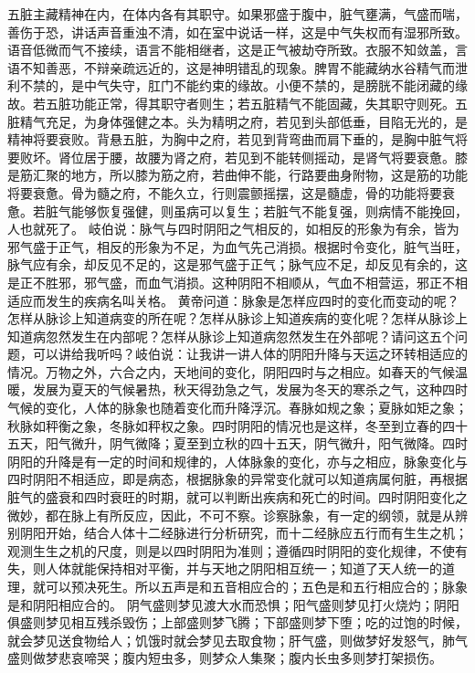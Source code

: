\documentclass[a4paper,12pt,UTF8,twoside]{ctexbook}
\begin{document}
五脏主藏精神在内，在体内各有其职守。如果邪盛于腹中，脏气壅满，气盛而喘，善伤于恐，讲话声音重浊不清，如在室中说话一样，这是中气失权而有湿邪所致。语音低微而气不接续，语言不能相继者，这是正气被劫夺所致。衣服不知敛盖，言语不知善恶，不辩亲疏远近的，这是神明错乱的现象。脾胃不能藏纳水谷精气而泄利不禁的，是中气失守，肛门不能约束的缘故。小便不禁的，是膀胱不能闭藏的缘故。若五脏功能正常，得其职守者则生；若五脏精气不能固藏，失其职守则死。五脏精气充足，为身体强健之本。头为精明之府，若见到头部低垂，目陷无光的，是精神将要衰败。背悬五脏，为胸中之府，若见到背弯曲而肩下垂的，是胸中脏气将要败坏。肾位居于腰，故腰为肾之府，若见到不能转侧摇动，是肾气将要衰惫。膝是筋汇聚的地方，所以膝为筋之府，若曲伸不能，行路要曲身附物，这是筋的功能将要衰惫。骨为髓之府，不能久立，行则震颤摇摆，这是髓虚，骨的功能将要衰惫。若脏气能够恢复强健，则虽病可以复生；若脏气不能复强，则病情不能挽回，人也就死了。
岐伯说：脉气与四时阴阳之气相反的，如相反的形象为有余，皆为邪气盛于正气，相反的形象为不足，为血气先己消损。根据时令变化，脏气当旺，脉气应有余，却反见不足的，这是邪气盛于正气；脉气应不足，却反见有余的，这是正不胜邪，邪气盛，而血气消损。这种阴阳不相顺从，气血不相营运，邪正不相适应而发生的疾病名叫关格。
黄帝问道：脉象是怎样应四时的变化而变动的呢？怎样从脉诊上知道病变的所在呢？怎样从脉诊上知道疾病的变化呢？怎样从脉诊上知道病忽然发生在内部呢？怎样从脉诊上知道病忽然发生在外部呢？请问这五个问题，可以讲给我听吗？岐伯说：让我讲一讲人体的阴阳升降与天运之环转相适应的情况。万物之外，六合之内，天地间的变化，阴阳四时与之相应。如春天的气候温暖，发展为夏天的气候暑热，秋天得劲急之气，发展为冬天的寒杀之气，这种四时气候的变化，人体的脉象也随着变化而升降浮沉。春脉如规之象；夏脉如矩之象；秋脉如秤衡之象，冬脉如秤权之象。四时阴阳的情况也是这样，冬至到立春的四十五天，阳气微升，阴气微降；夏至到立秋的四十五天，阴气微升，阳气微降。四时阴阳的升降是有一定的时间和规律的，人体脉象的变化，亦与之相应，脉象变化与四时阴阳不相适应，即是病态，根据脉象的异常变化就可以知道病属何脏，再根据脏气的盛衰和四时衰旺的时期，就可以判断出疾病和死亡的时间。四时阴阳变化之微妙，都在脉上有所反应，因此，不可不察。诊察脉象，有一定的纲领，就是从辨别阴阳开始，结合人体十二经脉进行分析研究，而十二经脉应五行而有生生之机；观测生生之机的尺度，则是以四时阴阳为准则；遵循四时阴阳的变化规律，不使有失，则人体就能保持相对平衡，并与天地之阴阳相互统一；知道了天人统一的道理，就可以预决死生。所以五声是和五音相应合的；五色是和五行相应合的；脉象是和阴阳相应合的。
阴气盛则梦见渡大水而恐惧；阳气盛则梦见打火烧灼；阴阳俱盛则梦见相互残杀毁伤；上部盛则梦飞腾；下部盛则梦下堕；吃的过饱的时候，就会梦见送食物给人；饥饿时就会梦见去取食物；肝气盛，则做梦好发怒气，肺气盛则做梦悲哀啼哭；腹内短虫多，则梦众人集聚；腹内长虫多则梦打架损伤。
\end{document}
